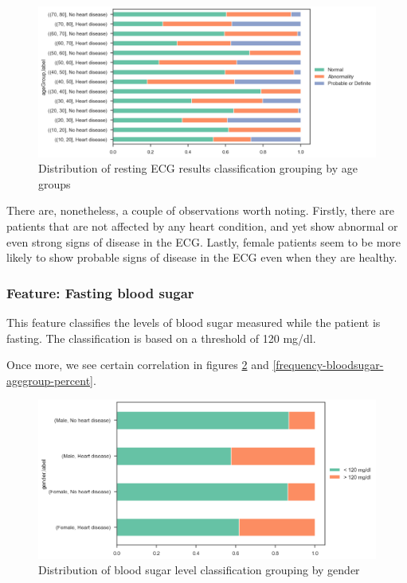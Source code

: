 \begin{figure}
    \caption{Distribution of resting ECG results classification grouping by age groups}\label{frequency-ecg-agegroup-percent}
    \centering
    \includegraphics[width=\linewidth]{media/frequency-06-agegroup-ecg.png}
\end{figure}

There are, nonetheless, a couple of observations worth noting. Firstly, there are patients that are not affected
by any heart condition, and yet show abnormal or even strong signs of disease in the ECG. Lastly, female patients
seem to be more likely to show probable signs of disease in the ECG even when they are healthy.

\subsubsection{Feature: Fasting blood sugar}

This feature classifies the levels of blood sugar measured while the patient is fasting. The classification is based
on a threshold of 120 mg/dl.

Once more, we see certain correlation in figures \ref{frequency-bloodsugar-gender-percent} and
\ref{frequency-bloodsugar-agegroup-percent}.

\begin{figure}
    \caption{Distribution of blood sugar level classification grouping by gender}\label{frequency-bloodsugar-gender-percent}
    \centering
    \includegraphics[width=\linewidth]{media/frequency-07-gender-bloodsugar.png}
\end{figure}

